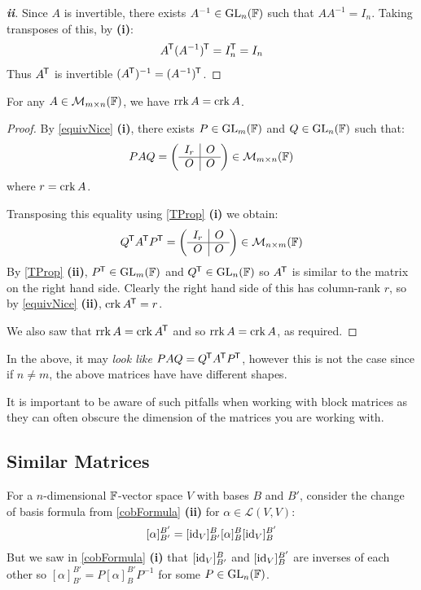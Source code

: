 \documentclass[../main.tex]{subfiles}
\begin{document}
\begin{proof}[\textbf{ii}]
  Since $A$ is invertible, there exists $A^{-1} \in \mathrm{GL}_n(\mathbb{F})$ such that $A A^{-1} = I_n$.
  Taking transposes of this, by \textbf{(i)}:
  \[
    A^{{\mkern-1.5mu\mathsf{T}}} (A^{-1})^{{\mkern-1.5mu\mathsf{T}}} = I^{{\mkern-1.5mu\mathsf{T}}}_n = I_n
  \]
  Thus $A^{{\mkern-1.5mu\mathsf{T}}}$ is invertible $(A^{{\mkern-1.5mu\mathsf{T}}})^{-1} = (A^{-1})^{{\mkern-1.5mu\mathsf{T}}}$.
\end{proof}
\begin{theorem}
  For any $A \in \mathcal{M}_{m \times n}(\mathbb{F})$, we have $\operatorname{rrk} A = \operatorname{crk} A$. \label{rowColRank}
\end{theorem}
\begin{proof}
  By \cref{equivNice} \textbf{(i)}, there exists $P \in \mathrm{GL}_m(\mathbb{F})$ and $Q \in \mathrm{GL}_n(\mathbb{F})$ such that:
  \[
    PAQ = \left(\begin{array}{c|c}
    I_r & O \\ \hline
    O & O
    \end{array}\right) \in \mathcal{M}_{m \times n}(\mathbb{F})
  \]
  where $r = \operatorname{crk} A$.

  Transposing this equality using \cref{TProp} \textbf{(i)} we obtain:
  \[
    Q^{{\mkern-1.5mu\mathsf{T}}} A^{{\mkern-1.5mu\mathsf{T}}} P^{{\mkern-1.5mu\mathsf{T}}} = \left(\begin{array}{c|c}
    I_r & O \\ \hline
    O & O
    \end{array}\right) \in \mathcal{M}_{n \times m}(\mathbb{F})
  \]
  By \cref{TProp} \textbf{(ii)}, $P^{{\mkern-1.5mu\mathsf{T}}} \in \mathrm{GL}_m(\mathbb{F})$ and $Q^{{\mkern-1.5mu\mathsf{T}}} \in \mathrm{GL}_n(\mathbb{F})$ so $A^{{\mkern-1.5mu\mathsf{T}}}$ is similar to the matrix on the right hand side.
  Clearly the right hand side of this has column-rank $r$, so by \cref{equivNice} \textbf{(ii)}, $\operatorname{crk} A^{{\mkern-1.5mu\mathsf{T}}} = r$.

  We also saw that $\operatorname{rrk} A = \operatorname{crk} A^{{\mkern-1.5mu\mathsf{T}}}$ and so $\operatorname{rrk} A = \operatorname{crk} A$, as required.
\end{proof}
\begin{remark}[Warning]
  In the above, it may \textit{look like} $PAQ = Q^{{\mkern-1.5mu\mathsf{T}}} A^{{\mkern-1.5mu\mathsf{T}}} P^{{\mkern-1.5mu\mathsf{T}}}$, however this is not the case since if $n \neq m$, the above matrices have have different shapes.

  It is important to be aware of such pitfalls when working with block matrices as they can often obscure the dimension of the matrices you are working with.
\end{remark}
\subsection{Similar Matrices}
For a $n$-dimensional $\mathbb{F}$-vector space $V$ with bases $B$ and $B'$, consider the change of basis formula from \cref{cobFormula} \textbf{(ii)} for $\alpha \in \mathcal{L}(V, V)$:
\[
  [\alpha]^{B'}_{B'} = [\mathrm{id}_V]^{B}_{B'} [\alpha]^{B}_{B} [\mathrm{id}_V]^{B'}_{B}
\]
But we saw in \cref{cobFormula} \textbf{(i)} that $[\mathrm{id}_V]^{B}_{B'}$ and $[\mathrm{id}_V]^{B'}_{B}$ are inverses of each other so $[\alpha]^{B'}_{B'} = P[\alpha]^{B'}_{B}P^{-1}$ for some $P \in \mathrm{GL}_n(\mathbb{F})$.
\end{document}

